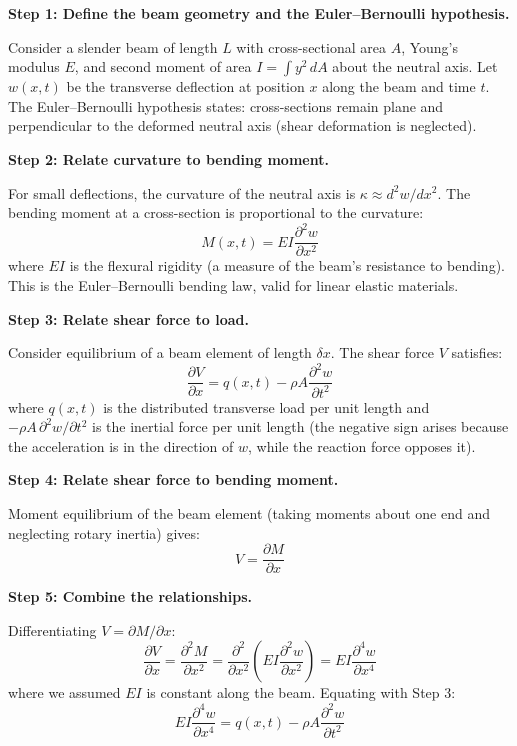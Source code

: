 \documentclass[11pt,openright]{book}
\begin{document}
\textbf{Step 1: Define the beam geometry and the Euler--Bernoulli hypothesis.}

Consider a slender beam of length $L$ with cross-sectional area $A$, Young's modulus $E$, and second moment of area $I = \int y^2\,dA$ about the neutral axis. Let $w(x,t)$ be the transverse deflection at position $x$ along the beam and time $t$. The Euler--Bernoulli hypothesis states: cross-sections remain plane and perpendicular to the deformed neutral axis (shear deformation is neglected).

\textbf{Step 2: Relate curvature to bending moment.}

For small deflections, the curvature of the neutral axis is $\kappa \approx d^2w/dx^2$. The bending moment at a cross-section is proportional to the curvature:
\begin{equation}
M(x,t) = EI\frac{\partial^2 w}{\partial x^2}
\end{equation}
where $EI$ is the flexural rigidity (a measure of the beam's resistance to bending). This is the Euler--Bernoulli bending law, valid for linear elastic materials.

\textbf{Step 3: Relate shear force to load.}

Consider equilibrium of a beam element of length $\delta x$. The shear force $V$ satisfies:
\begin{equation}
\frac{\partial V}{\partial x} = q(x,t) - \rho A\frac{\partial^2 w}{\partial t^2}
\end{equation}
where $q(x,t)$ is the distributed transverse load per unit length and $-\rho A\,\partial^2 w/\partial t^2$ is the inertial force per unit length (the negative sign arises because the acceleration is in the direction of $w$, while the reaction force opposes it).

\textbf{Step 4: Relate shear force to bending moment.}

Moment equilibrium of the beam element (taking moments about one end and neglecting rotary inertia) gives:
\begin{equation}
V = \frac{\partial M}{\partial x}
\end{equation}

\textbf{Step 5: Combine the relationships.}

Differentiating $V = \partial M/\partial x$:
\begin{equation}
\frac{\partial V}{\partial x} = \frac{\partial^2 M}{\partial x^2} = \frac{\partial^2}{\partial x^2}\left(EI\frac{\partial^2 w}{\partial x^2}\right) = EI\frac{\partial^4 w}{\partial x^4}
\end{equation}
where we assumed $EI$ is constant along the beam. Equating with Step 3:
\begin{equation}
EI\frac{\partial^4 w}{\partial x^4} = q(x,t) - \rho A\frac{\partial^2 w}{\partial t^2}
\end{equation}
\end{document}
